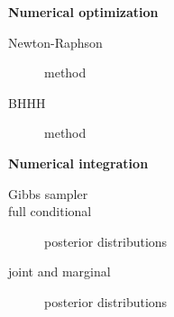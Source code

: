 \documentclass[notes,blackandwhite,mathsans]{beamer}
\begin{document}
{
\begin{frame}

\vspace{1cm} \textbf{\color{mcxs2}Numerical optimization}
\begin{description}
\item[Newton-Raphson] {\color{mcxs5}method}
\item[BHHH] {\color{mcxs5}method}
\end{description}

\bigskip\textbf{\color{mcxs2}Numerical integration}
\begin{description}
\item[Gibbs sampler]
\item[full conditional] {\color{mcxs5}posterior distributions}
\item[joint and marginal] {\color{mcxs5}posterior distributions}
\end{description}

\end{frame}
}
\end{document}
